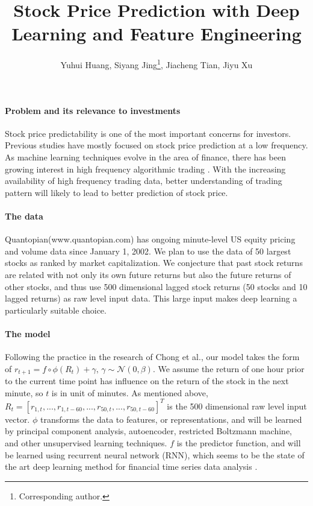 \documentclass{article}
\title{Stock Price Prediction with Deep Learning and Feature Engineering}
\author{Yuhui Huang, Siyang Jing\thanks{Corresponding author.}, Jiacheng Tian, Jiyu Xu}
\begin{document}
\maketitle
\paragraph{Problem and its relevance to investments}
Stock price predictability is one of the most important concerns for investors. Previous studies have mostly focused on stock price prediction at a low frequency. As machine learning techniques evolve in the area of finance, there has been growing interest in high frequency algorithmic trading \cite{Kearns2013}. With the increasing availability of high frequency trading data, better understanding of trading pattern will likely to lead to better prediction of stock price.

\paragraph{The data}
Quantopian(www.quantopian.com) has ongoing minute-level US equity pricing and volume data since January 1, 2002. We plan to use the data of 50 largest stocks as ranked by market capitalization. We conjecture that past stock returns are related with not only its own future returns but also the future returns of other stocks, and thus use 500 dimensional lagged stock returns (50 stocks and 10 lagged returns) as raw level input data. This large input makes deep learning a particularly suitable choice.

\paragraph{The model}
Following the practice in the research of Chong et al.\cite{Chong2017}, our model takes the form of
$r_{t+1}=f\circ\phi(R_t)+\gamma,\,\gamma\sim\mathcal{N}(0,\beta)$.
We assume the return of one hour prior to the current time point has influence on the return of the stock in the next minute, so $t$ is in unit of minutes. As mentioned above, $R_t = [r_{1,t},...,r_{1,t-60},...,r_{50,t},...,r_{50,t-60}]^T$ is the 500 dimensional raw level input vector. $\phi$ transforms the data to features, or representations, and will be learned by principal component analysis, autoencoder, restricted Boltzmann machine, and other unsupervised learning techniques. $f$ is the predictor function, and will be learned using recurrent neural network (RNN), which seems to be the state of the art deep learning method for financial time series data analysis \cite{Abe2018}.
\end{document}
